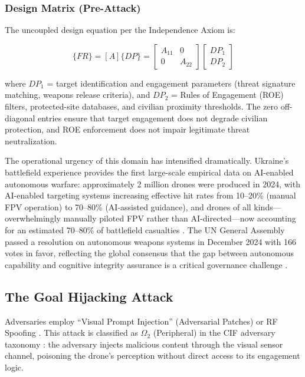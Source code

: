 \documentclass[
]{article}
\begin{document}
\subsubsection{Design Matrix
(Pre-Attack)}\label{design-matrix-pre-attack-3}

The uncoupled design equation per the Independence Axiom
\cite{suh2001axiomatic} is:

\begin{equation}
\{FR\} = [A]\{DP\} = \begin{bmatrix} A_{11} & 0 \\ 0 & A_{22} \end{bmatrix} \begin{bmatrix} DP_1 \\ DP_2 \end{bmatrix}
\label{eq:drone_wars_baseline}
\end{equation}

where \(DP_1\) = target identification and engagement parameters (threat
signature matching, weapons release criteria), and \(DP_2\) = Rules of
Engagement (ROE) filters, protected-site databases, and civilian
proximity thresholds. The zero off-diagonal entries ensure that target
engagement does not degrade civilian protection, and ROE enforcement
does not impair legitimate threat neutralization.

The operational urgency of this domain has intensified dramatically.
Ukraine's battlefield experience provides the first large-scale
empirical data on AI-enabled autonomous warfare: approximately 2 million
drones were produced in 2024, with AI-enabled targeting systems
increasing effective hit rates from 10--20\% (manual FPV operation) to
70--80\% (AI-assisted guidance), and drones of all
kinds---overwhelmingly manually piloted FPV rather than
AI-directed---now accounting for an estimated 70--80\% of battlefield
casualties \cite{bondar2025ukraine}. The UN General Assembly passed a
resolution on autonomous weapons systems in December 2024 with 166 votes
in favor, reflecting the global consensus that the gap between
autonomous capability and cognitive integrity assurance is a critical
governance challenge \cite{king2024robotwars}.

\subsection{The Goal Hijacking
Attack}\label{the-goal-hijacking-attack-3}

Adversaries employ ``Visual Prompt Injection'' (Adversarial Patches) or
RF Spoofing \cite{qi2024visual}. This attack is classified as
\(\Omega_2\) (Peripheral) in the CIF adversary taxonomy
\cite{friedman2026cogsec1}: the adversary injects malicious content
through the visual sensor channel, poisoning the drone's perception
without direct access to its engagement logic.
\end{document}
